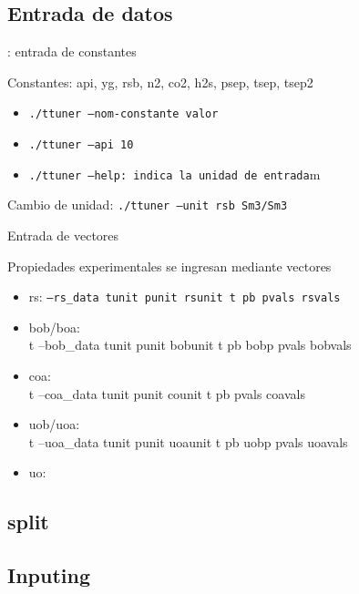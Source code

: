 \documentclass{beamer}
\begin{document}
\subsection{Entrada de datos}

\newcommand{\com}[1]{\textquotedbl #1\textquotedbl}

\begin{frame}{\ttuner: entrada de constantes}
 
Constantes: api, yg, rsb, n2, co2, h2s, psep, tsep, tsep2
\begin{itemize}
 \item {\tt ./ttuner --nom-constante valor}

 \item {\tt ./ttuner --api 10}

 \item {\tt ./ttuner --help: indica la unidad de entrada}m

\end{itemize}

Cambio de unidad: {\tt ./ttuner --unit \com{rsb Sm3/Sm3}}

\end{frame}

\begin{frame}{Entrada de vectores}

Propiedades experimentales se ingresan mediante vectores

\begin{itemize}
 \item rs: {\tt --rs\_data \com{tunit punit rsunit t pb pvals rsvals}}
 \item bob/boa: {\\t --bob\_data \com{tunit punit bobunit t pb bobp pvals bobvals}}
 \item coa: {\\t --coa\_data \com{tunit punit counit t pb pvals coavals}}
 \item uob/uoa: {\\t --uoa\_data \com{tunit punit uoaunit t pb uobp pvals uoavals}}
 \item uo:
\end{itemize}
\end{frame}

\subsection{split}

\subsection{Inputing}
\end{document}
